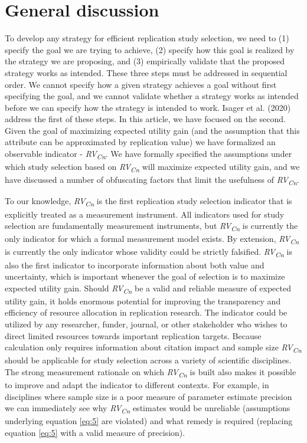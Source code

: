 \documentclass[
  english,
  jou,floatsintext]{apa6}
\begin{document}
\hypertarget{general-discussion}{%
\section{General discussion}\label{general-discussion}}

To develop any strategy for efficient replication study selection, we need to (1) specify the goal we are trying to achieve, (2) specify how this goal is realized by the strategy we are proposing, and (3) empirically validate that the proposed strategy works as intended. These three steps must be addressed in sequential order. We cannot specify how a given strategy achieves a goal without first specifying the goal, and we cannot validate whether a strategy works as intended before we can specify how the strategy is intended to work. Isager et al. (2020) address the first of these steps. In this article, we have focused on the second. Given the goal of maximizing expected utility gain (and the assumption that this attribute can be approximated by replication value) we have formalized an observable indicator - \emph{RV\textsubscript{Cn}}. We have formally specified the assumptions under which study selection based on \emph{RV\textsubscript{Cn}} will maximize expected utility gain, and we have discussed a number of obfuscating factors that limit the usefulness of \emph{RV\textsubscript{Cn}}.

To our knowledge, \emph{RV\textsubscript{Cn}} is the first replication study selection indicator that is explicitly treated as a measurement instrument. All indicators used for study selection are fundamentally measurement instruments, but \emph{RV\textsubscript{Cn}} is currently the only indicator for which a formal measurement model exists. By extension, \emph{RV\textsubscript{Cn}} is currently the only indicator whose validity could be strictly falsified. \emph{RV\textsubscript{Cn}} is also the first indicator to incorporate information about both value and uncertainty, which is important whenever the goal of selection is to maximize expected utility gain. Should \emph{RV\textsubscript{Cn}} be a valid and reliable measure of expected utility gain, it holds enormous potential for improving the transparency and efficiency of resource allocation in replication research. The indicator could be utilized by any researcher, funder, journal, or other stakeholder who wishes to direct limited resources towards important replication targets. Because calculation only requires information about citation impact and sample size \emph{RV\textsubscript{Cn}} should be applicable for study selection across a variety of scientific disciplines. The strong measurement rationale on which \emph{RV\textsubscript{Cn}} is built also makes it possible to improve and adapt the indicator to different contexts. For example, in disciplines where sample size is a poor measure of parameter estimate precision we can immediately see why \emph{RV\textsubscript{Cn}} estimates would be unreliable (assumptions underlying equation \eqref{eq:5} are violated) and what remedy is required (replacing equation \eqref{eq:5} with a valid measure of precision).
\end{document}
